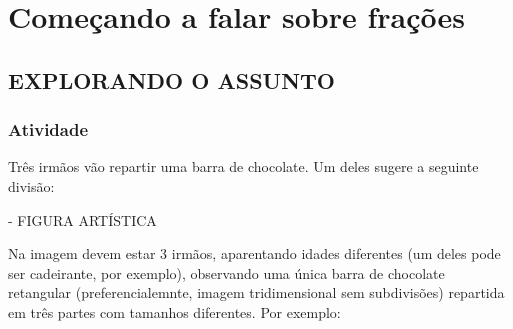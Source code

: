 \documentclass[a4,12pt]{book}
\begin{document}
\chapter{Começando a falar sobre frações }












\section{ EXPLORANDO O ASSUNTO }


\subsection{Atividade}

Três irmãos vão repartir uma barra de chocolate. Um deles sugere a seguinte divisão: 

\begin{imagem*}[breakable]{}{}   - FIGURA ARTÍSTICA   
  
  Na imagem devem estar 3 irmãos, aparentando idades diferentes (um deles pode ser cadeirante, por exemplo), observando uma única barra de chocolate retangular (preferencialemnte, imagem tridimensional sem subdivisões) repartida em três partes com tamanhos diferentes. Por exemplo:  
  
  
\end{imagem*}
\end{document}
